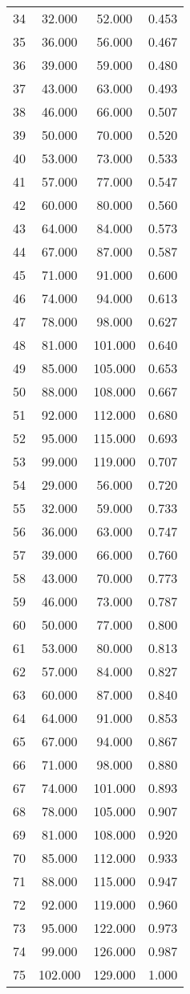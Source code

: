 \begin{tabular}{cccc}
  34 & 32.000 & 52.000 & 0.453 \\ 
  35 & 36.000 & 56.000 & 0.467 \\ 
  36 & 39.000 & 59.000 & 0.480 \\ 
  37 & 43.000 & 63.000 & 0.493 \\ 
  38 & 46.000 & 66.000 & 0.507 \\ 
  39 & 50.000 & 70.000 & 0.520 \\ 
  40 & 53.000 & 73.000 & 0.533 \\ 
  41 & 57.000 & 77.000 & 0.547 \\ 
  42 & 60.000 & 80.000 & 0.560 \\ 
  43 & 64.000 & 84.000 & 0.573 \\ 
  44 & 67.000 & 87.000 & 0.587 \\ 
  45 & 71.000 & 91.000 & 0.600 \\ 
  46 & 74.000 & 94.000 & 0.613 \\ 
  47 & 78.000 & 98.000 & 0.627 \\ 
  48 & 81.000 & 101.000 & 0.640 \\ 
  49 & 85.000 & 105.000 & 0.653 \\ 
  50 & 88.000 & 108.000 & 0.667 \\ 
  51 & 92.000 & 112.000 & 0.680 \\ 
  52 & 95.000 & 115.000 & 0.693 \\ 
  53 & 99.000 & 119.000 & 0.707 \\ 
  54 & 29.000 & 56.000 & 0.720 \\ 
  55 & 32.000 & 59.000 & 0.733 \\ 
  56 & 36.000 & 63.000 & 0.747 \\ 
  57 & 39.000 & 66.000 & 0.760 \\ 
  58 & 43.000 & 70.000 & 0.773 \\ 
  59 & 46.000 & 73.000 & 0.787 \\ 
  60 & 50.000 & 77.000 & 0.800 \\ 
  61 & 53.000 & 80.000 & 0.813 \\ 
  62 & 57.000 & 84.000 & 0.827 \\ 
  63 & 60.000 & 87.000 & 0.840 \\ 
  64 & 64.000 & 91.000 & 0.853 \\ 
  65 & 67.000 & 94.000 & 0.867 \\ 
  66 & 71.000 & 98.000 & 0.880 \\ 
  67 & 74.000 & 101.000 & 0.893 \\ 
  68 & 78.000 & 105.000 & 0.907 \\ 
  69 & 81.000 & 108.000 & 0.920 \\ 
  70 & 85.000 & 112.000 & 0.933 \\ 
  71 & 88.000 & 115.000 & 0.947 \\ 
  72 & 92.000 & 119.000 & 0.960 \\ 
  73 & 95.000 & 122.000 & 0.973 \\ 
  74 & 99.000 & 126.000 & 0.987 \\ 
  75 & 102.000 & 129.000 & 1.000 \\ 
   \hline
\end{tabular}
